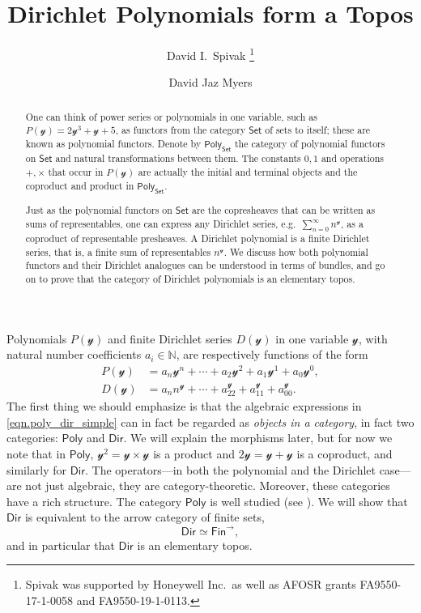 \documentclass[11pt, article, one side]{memoir}
\theoremstyle{theorem}
\theoremstyle{definition}
\theoremstyle{remark}
\newcommand{\cat}[1]{\mathcal{#1}}%
\newcommand{\Cat}[1]{\mathsf{#1}}%
\newcommand{\nn}{\mathbb{N}}
\newcommand{\smset}{\Cat{Set}}
\newcommand{\finset}{\Cat{Fin}}
\newcommand{\yon}{\mathcal{y}}
\newcommand{\poly}{\Cat{Poly}}
\newcommand{\dir}{\Cat{Dir}}
\begin{document}
\title{Dirichlet Polynomials form a Topos}

\author{David I.\ Spivak%
\thanks{Spivak was supported by Honeywell Inc.\ as well as AFOSR grants FA9550-17-1-0058 and FA9550-19-1-0113.}
\and David Jaz Myers%
}

\maketitle
\begin{abstract}
One can think of power series or polynomials in one variable, such as $P(\yon)=2\yon^3+\yon+5$, as functors from the category $\smset$ of sets to itself; these are known as polynomial functors. Denote by $\poly_\smset$ the category of polynomial functors on $\smset$ and natural transformations between them. The constants $0,1$ and operations $+,\times$ that occur in $P(\yon)$ are actually the initial and terminal objects and the coproduct and product in $\poly_\smset$. 

Just as the polynomial functors on $\smset$ are the copresheaves that can be written as sums of representables, one can express any Dirichlet series, e.g.\ $\sum_{n=0}^\infty n^\yon$, as a coproduct of representable presheaves. A Dirichlet polynomial is a finite Dirichlet series, that is, a finite sum of representables $n^{\yon}$. We discuss how both polynomial functors and their Dirichlet analogues can be understood in terms of bundles, and go on to prove that the category of Dirichlet polynomials is an elementary topos.

\end{abstract}

Polynomials $P(\yon)$ and finite Dirichlet series $D(\yon)$ in one variable $\cat{y}$, with natural number coefficients $a_i\in\nn$, are respectively functions of the form
\begin{equation}\label{eqn.poly_dir_simple}
\begin{aligned}
  P(\yon)&=a_n\yon^n+\cdots+a_2\yon^2+a_1\yon^1+a_0\yon^0,\\
  D(\yon)&=a_n n^\yon+\cdots+a_22^\yon+a_11^\yon+a_00^\yon.
\end{aligned}
\end{equation}
The first thing we should emphasize is that the algebraic expressions in \eqref{eqn.poly_dir_simple} can in fact be regarded as \emph{objects in a category}, in fact two categories: $\poly$ and $\dir$. We will explain the morphisms later, but for now we note that in $\poly$, $\yon^2=\yon\times\yon$ is a product and $2\yon=\yon+\yon$ is a coproduct, and similarly for $\dir$. The operators---in both the polynomial and the Dirichlet case---are not just algebraic, they are category-theoretic. Moreover, these categories have a rich structure. The category $\poly$ is well studied (see \cite{GK:Polynomial.Functors}). We will show that $\dir$ is equivalent to the arrow category of finite sets, 
\[\dir \simeq \finset^{\to},\]
and in particular that $\dir$ is an elementary topos.
\end{document}
